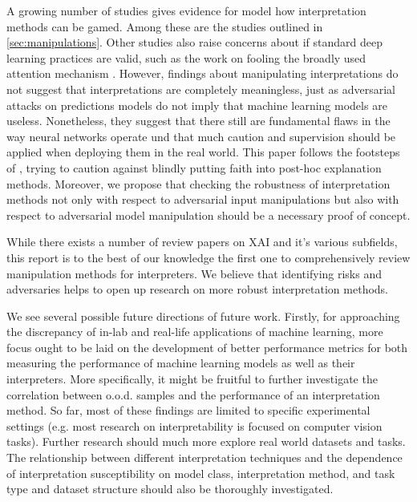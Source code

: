 A growing number of studies gives evidence for model how interpretation methods can be gamed. Among these are the studies outlined in \autoref{sec:manipulations}. Other studies also raise concerns about if standard deep learning practices are valid, such as the work on fooling the broadly used attention mechanism \cite{jain2019attention}.
However, findings about manipulating interpretations do not suggest that interpretations are completely meaningless, just as adversarial attacks on predictions models do not imply that machine learning models are useless. Nonetheless, they suggest that there still are fundamental flaws in the way neural networks operate und that much caution and supervision should be applied when deploying them in the real world. 
This paper follows the footsteps of \cite{lipton2018mythos}, trying to caution against blindly putting faith into post-hoc explanation methods. Moreover, we propose that checking the robustness of interpretation methods not only with respect to adversarial input manipulations but also with respect to adversarial model manipulation should be a necessary proof of concept. 

While there exists a number of review papers on XAI and it's various subfields, this report is to the best of our knowledge the first one to comprehensively review manipulation methods for interpreters. 
We believe that identifying risks and adversaries helps to open up research on more robust interpretation methods. 


 \newline
We see several possible future directions of future work. Firstly, for approaching the discrepancy of in-lab and real-life applications of machine learning, more focus ought to be laid on the development of better performance metrics for both measuring the performance of machine learning models as well as their interpreters. 
More specifically, it might be fruitful to further investigate the correlation between o.o.d. samples and the performance of an interpretation method. So far, most of these findings are limited to specific experimental settings (e.g. most research on interpretability is focused on computer vision tasks).
Further research should much more explore real world datasets and tasks. The relationship between different interpretation techniques and the dependence of interpretation susceptibility on model class, interpretation method, and task type and dataset structure should also be thoroughly investigated. 
